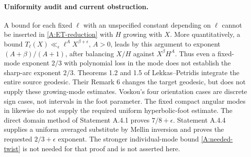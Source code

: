\paragraph{Uniformity audit and current obstruction.}
A bound for each fixed $\ell$ with an unspecified constant depending on
$\ell$ cannot be inserted in \eqref{A:ET-reduction} with $H$ growing
with $X$. More quantitatively, a bound
$T_\ell(X)\ll_\epsilon \ell^A X^{\beta+\epsilon}$, $A>0$, leads by this
argument to exponent $(A+\beta)/(A+1)$, after balancing $X/H$ against
$X^\beta H^A$. Thus even a fixed-mode exponent $2/3$ with polynomial
loss in the mode does not establish the sharp-arc exponent $2/3$.
Theorems 1.2 and 1.5 of Lekkas--Petridis integrate the entire source
geodesic. Their Remark 6 changes the target geodesic, but does not
supply these growing-mode estimates. Voskou's four orientation cases
\cite{Voskou2024} are discrete sign cases, not intervals in the foot
parameter. The fixed compact angular modes in
\cite[Theorem 1.1]{BourgainKontorovichSarnak2010} likewise do not
supply the required uniform hyperbolic-foot estimate.
The direct domain method of Statement A.4.1 proves $7/8+\epsilon$.
Statement A.4.4 supplies a uniform averaged substitute by Mellin
inversion and proves the requested $2/3+\epsilon$ exponent. The
stronger individual-mode bound \eqref{A:needed-twist} is not needed
for that proof and is not asserted here.


